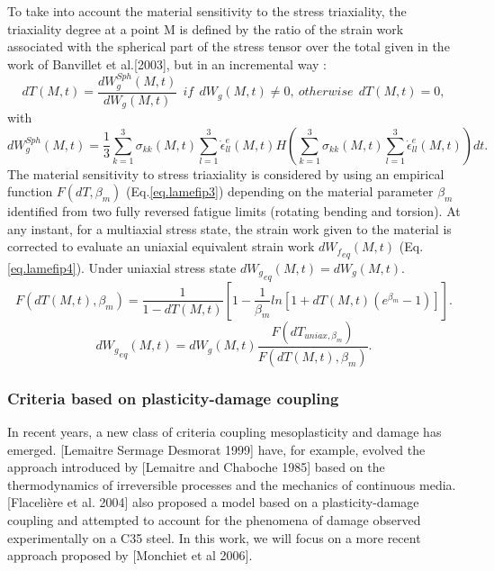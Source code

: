 \documentclass[3p,times,procedia,number]{elsarticle}
\begin{document}
To take into account the material sensitivity to the stress triaxiality, the triaxiality degree at a point M is defined by the ratio of the strain work associated with the spherical part of the stress tensor over the total given in the work of Banvillet et al.[2003]\cite{banvillet2003volumetric}, but in an incremental way :
$$dT(M,t)=\dfrac{dW_g^{Sph}(M,t)}{dW_g(M,t)} \ \ if \ \  dW_g(M,t)\neq0,\ otherwise \ \ dT(M,t)=0,$$
with
$$dW_g^{Sph}(M,t)=\dfrac{1}{3}\sum_{k=1}^{3}\sigma_{kk}(M,t)\sum_{l=1}^{3}\dot{\epsilon}_{ll}^e(M,t)H\left( \sum_{k=1}^{3}\sigma_{kk}(M,t)\sum_{l=1}^{3}\dot{\epsilon}_{ll}^e(M,t)\right)dt .$$
The material sensitivity to stress triaxiality is considered by using an empirical function
$F(dT,\beta_m)$ (Eq.\eqref{eq.lamefip3}) depending on the material parameter $\beta_m$ identified from two fully reversed
fatigue limits (rotating bending and torsion). At any instant, for a multiaxial stress state, the
strain work given to the material is corrected to evaluate an uniaxial equivalent strain work
$d{W_f}_{eq} (M,t)$ (Eq.\eqref{eq.lamefip4}). Under uniaxial stress state $d{W_g}_{eq} (M,t)=dW_g(M,t)$.
\begin{equation}
F(dT(M,t),\beta_m)=\dfrac{1}{1-dT(M,t)}\left[ 1-\dfrac{1}{\beta_m}ln\left[1+dT(M,t)(e^{\beta_m}-1) \right] \right] .
\label{eq.lamefip3}
\end{equation}
\begin{equation}
d{W_g}_{eq} (M,t)=d{W_g}(M,t)\dfrac{F(dT_{uniax,\beta_m})}{F(dT(M,t),\beta_m)}.
\label{eq.lamefip4}
\end{equation}

\subsubsection{Criteria based on plasticity-damage coupling}
In recent years, a new class of criteria coupling mesoplasticity and damage has emerged. [Lemaitre Sermage Desmorat 1999]\cite{lemaitre1999two} have, for example, evolved the approach introduced by [Lemaitre and Chaboche 1985]\cite{lemaitre1985mecanique} based on the thermodynamics of irreversible processes and the mechanics of continuous media. [Flaceli{\`e}re et al. 2004]\cite{flaceliere2004contribution} also proposed a model based on a plasticity-damage coupling and attempted to account for the phenomena of damage observed experimentally on a C35 steel. In this work, we will focus on a more recent approach proposed by [Monchiet et al 2006]\cite{monchiet2006contributions}.
\end{document}
